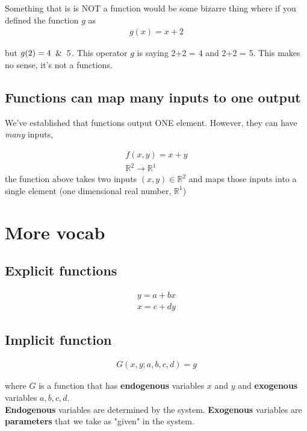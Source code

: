 \documentclass{article}
\begin{document}
Something that is is NOT a function would be some bizarre thing where if you defined the function $g$ as 
\begin{align*}
    g(x) = x+2
\end{align*}

but $g(2) = 4 \And 5$. This operator $g$ is saying 2+2 = 4 and 2+2 = 5. This makes no sense, it's not a functions. \\

\subsection{Functions can map many inputs to one output}

We've established that functions output ONE element. However, they can have \textit{many} inputs, 

\begin{align*}
    f(x,y) = x + y\\
    \mathbb{R}^2 \rightarrow \mathbb{R}^1
\end{align*}
the function above takes two inputs $(x,y) \in \mathbb{R}^2$ and maps those inputs into a single element (one dimensional real number, $\mathbb{R}^1$)

\section{More vocab}
\subsection{Explicit functions}
\begin{align*}
    y = a + b x\\
    x = c + dy
\end{align*}

\subsection{Implicit function}
\begin{align*}
    G(x, y; a, b, c, d) = g
\end{align*}

where $G$ is a function that has \textbf{endogenous} variables $x$ and $y$ and \textbf{exogenous} variables $a, b, c, d$. \\

\textbf{Endogenous} variables are determined by the system. \textbf{Exogenous} variables are \textbf{parameters} that we take as "given" in the system. 
\end{document}
